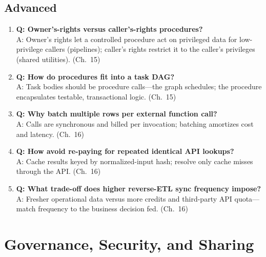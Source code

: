 \subsection{Advanced}
\begin{enumerate}
    \item \textbf{Q: Owner's-rights versus caller's-rights procedures?}\\
    A: Owner's rights let a controlled procedure act on privileged data for low-privilege callers (pipelines); caller's rights restrict it to the caller's privileges (shared utilities). (Ch.~15)
    \item \textbf{Q: How do procedures fit into a task DAG?}\\
    A: Task bodies should be procedure calls---the graph schedules; the procedure encapsulates testable, transactional logic. (Ch.~15)
    \item \textbf{Q: Why batch multiple rows per external function call?}\\
    A: Calls are synchronous and billed per invocation; batching amortizes cost and latency. (Ch.~16)
    \item \textbf{Q: How avoid re-paying for repeated identical API lookups?}\\
    A: Cache results keyed by normalized-input hash; resolve only cache misses through the API. (Ch.~16)
    \item \textbf{Q: What trade-off does higher reverse-ETL sync frequency impose?}\\
    A: Fresher operational data versus more credits and third-party API quota---match frequency to the business decision fed. (Ch.~16)
\end{enumerate}

\section{Governance, Security, and Sharing}

